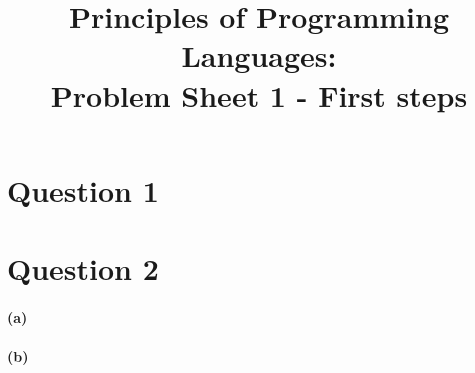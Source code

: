 \documentclass[11pt]{article} %
\title{Principles of Programming Languages: \\Problem Sheet 1 - First steps}
\author{}
\date{}
\begin{document}
%
\maketitle




\section*{Question 1}



\clearpage
\section*{Question 2}


\paragraph{(a)}


\paragraph{(b)}

\end{document}
